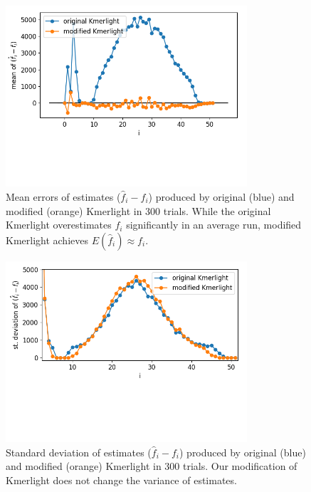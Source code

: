 \begin{figure}[h!]
\centerline{\includegraphics[width=0.8\textwidth, trim={0cm, 3.5cm, 0cm, 0cm}, clip]{images/means_comparison.png}}
\caption[Mean error of the original Kmerlight and the modified Kmerlight]{Mean errors of estimates
($\hat f_i - f_i$) produced by original (blue) and modified (orange) Kmerlight in 300 trials. 
While the original Kmerlight overestimates $f_i$ significantly in an average run,
modified Kmerlight achieves $E(\hat f_i) \approx f_i$.}
\label{img:mean-new-algorithm}
\end{figure}

\begin{figure}[h!]
\centerline{\includegraphics[width=0.8\textwidth, trim={0cm, 4.3cm, 0cm, 0cm}, clip]{images/std_deviations_comparison.png}}
\caption[Variance of the original Kmerlight and the modified Kmerlight]{Standard deviation
of estimates ($\hat f_i - f_i$) produced by original (blue) and modified (orange) Kmerlight 
in 300 trials. Our modification of Kmerlight does not change the variance of estimates.}
\label{img:std-new-algorithm}
\end{figure}

